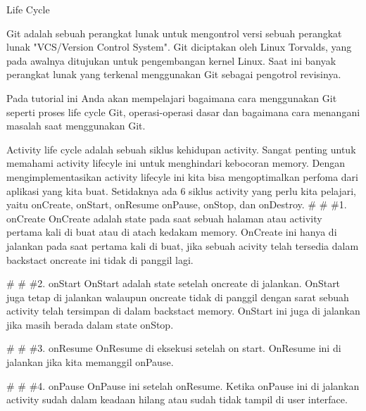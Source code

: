 \sloppy
\begin{center}Life Cycle\end{center} \par
\vspace{12pt}
\noindent 
Git adalah sebuah perangkat lunak untuk mengontrol versi sebuah perangkat lunak "VCS/Version Control System". Git diciptakan oleh Linux Torvalds, yang pada awalnya ditujukan untuk pengembangan kernel Linux. Saat ini banyak perangkat lunak yang terkenal menggunakan Git sebagai pengotrol revisinya. \par
\vspace{12pt}
\noindent 
Pada tutorial ini Anda akan mempelajari bagaimana cara menggunakan Git seperti proses life cycle Git, operasi-operasi dasar dan bagaimana cara menangani masalah saat menggunakan Git. \par
\vspace{12pt}
\noindent 
Activity life cycle adalah sebuah siklus kehidupan activity. Sangat penting untuk memahami activity lifecyle ini untuk menghindari kebocoran memory. Dengan mengimplementasikan activity lifecyle ini kita bisa mengoptimalkan perfoma dari aplikasi yang kita buat. Setidaknya ada 6 siklus activity yang perlu kita pelajari, yaitu $  $onCreate, onStart, onResume onPause, onStop, dan onDestroy.  $  \#  $ $  \#  $ $  \#  $1. onCreate OnCreate adalah state pada saat sebuah halaman atau activity pertama kali di buat atau di atach kedakam memory. OnCreate ini hanya di jalankan pada saat pertama kali di buat, jika sebuah acivity telah tersedia dalam backstact oncreate ini tidak di panggil lagi. \par
\vspace{12pt}
\noindent 
 $  \#  $ $  \#  $ $  \#  $2. onStart OnStart adalah state setelah oncreate di jalankan. OnStart juga tetap di jalankan walaupun oncreate tidak di panggil dengan sarat sebuah activity telah tersimpan di dalam backstact memory. OnStart ini juga di jalankan jika masih berada dalam state onStop. \par
\vspace{12pt}
\noindent 
 $  \#  $ $  \#  $ $  \#  $3. onResume OnResume di eksekusi setelah on start. OnResume ini di jalankan jika kita memanggil onPause. \par
\vspace{12pt}
\noindent 
 $  \#  $ $  \#  $ $  \#  $4. onPause OnPause ini setelah onResume. Ketika onPause ini di jalankan activity sudah dalam keadaan hilang atau sudah tidak tampil di user interface. \par

